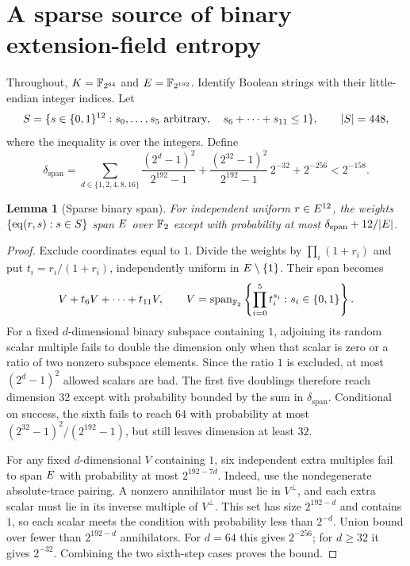 \documentclass[11pt]{article}
\newtheorem{lemma}{Lemma}
\begin{document}
\section{A sparse source of binary extension-field entropy}

Throughout, $K=\mathbb{F}_{2^{64}}$ and $E=\mathbb{F}_{2^{192}}$. Identify Boolean strings with their little-endian integer indices. Let
\[
 S=\{s\in\{0,1\}^{12}:s_0,\ldots,s_5\text{ arbitrary},\quad
                     s_6+\cdots+s_{11}\le1\},\qquad |S|=448,
\]
where the inequality is over the integers. Define
\[
 \delta_{\mathrm{span}}=
 \sum_{d\in\{1,2,4,8,16\}}\frac{(2^d-1)^2}{2^{192}-1}
 +\frac{(2^{32}-1)^2}{2^{192}-1}\,2^{-32}+2^{-256}
 <2^{-158}.
\]

\begin{lemma}[Sparse binary span]\label{lem:binary-span}
For independent uniform $r\in E^{12}$, the weights $\{\operatorname{eq}(r,s):s\in S\}$ span $E$ over $\mathbb{F}_2$ except with probability at most $\delta_{\mathrm{span}}+12/|E|$.
\end{lemma}
\begin{proof}
Exclude coordinates equal to $1$. Divide the weights by $\prod_i(1+r_i)$ and put $t_i=r_i/(1+r_i)$, independently uniform in $E\setminus\{1\}$. Their span becomes
\[
 V+t_6V+\cdots+t_{11}V,
 \qquad V=\operatorname{span}_{\mathbb{F}_2}\left\{\prod_{i=0}^5t_i^{s_i}:s_i\in\{0,1\}\right\}.
\]
For a fixed $d$-dimensional binary subspace containing $1$, adjoining its random scalar multiple fails to double the dimension only when that scalar is zero or a ratio of two nonzero subspace elements. Since the ratio $1$ is excluded, at most $(2^d-1)^2$ allowed scalars are bad. The first five doublings therefore reach dimension $32$ except with probability bounded by the sum in $\delta_{\mathrm{span}}$. Conditional on success, the sixth fails to reach $64$ with probability at most $(2^{32}-1)^2/(2^{192}-1)$, but still leaves dimension at least $32$.

For any fixed $d$-dimensional $V$ containing $1$, six independent extra multiples fail to span $E$ with probability at most $2^{192-7d}$. Indeed, use the nondegenerate absolute-trace pairing. A nonzero annihilator must lie in $V^\perp$, and each extra scalar must lie in its inverse multiple of $V^\perp$. This set has size $2^{192-d}$ and contains $1$, so each scalar meets the condition with probability less than $2^{-d}$. Union bound over fewer than $2^{192-d}$ annihilators. For $d=64$ this gives $2^{-256}$; for $d\ge32$ it gives $2^{-32}$. Combining the two sixth-step cases proves the bound.
\end{proof}
\end{document}
